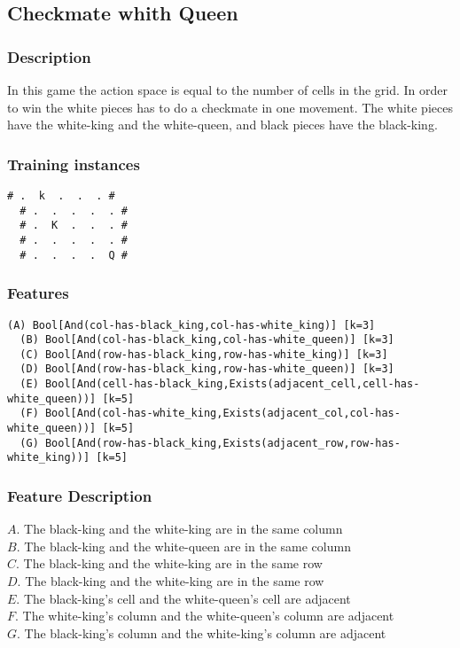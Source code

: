 \documentclass[a4paper]{article}
\begin{document}
\subsection{Checkmate whith Queen}
\subsubsection{Description}
In this game the action space is equal to the number of cells in the grid. In order to win the white pieces has to do a checkmate in one movement. The white pieces have the white-king and the white-queen, and black pieces have the black-king.

\subsubsection{Training instances}
\begin{Verbatim}[fontsize=\footnotesize]
  # .  k  .  .  . #
  # .  .  .  .  . #
  # .  K  .  .  . #
  # .  .  .  .  . #
  # .  .  .  .  Q #
\end{Verbatim}


\subsubsection{Features}
\begin{Verbatim}[fontsize=\footnotesize]
  (A) Bool[And(col-has-black_king,col-has-white_king)] [k=3]
  (B) Bool[And(col-has-black_king,col-has-white_queen)] [k=3]
  (C) Bool[And(row-has-black_king,row-has-white_king)] [k=3]
  (D) Bool[And(row-has-black_king,row-has-white_queen)] [k=3]
  (E) Bool[And(cell-has-black_king,Exists(adjacent_cell,cell-has-white_queen))] [k=5]
  (F) Bool[And(col-has-white_king,Exists(adjacent_col,col-has-white_queen))] [k=5]
  (G) Bool[And(row-has-black_king,Exists(adjacent_row,row-has-white_king))] [k=5]
\end{Verbatim}

\subsubsection{Feature Description}
$A$. The black-king and the white-king are in the same column\\
$B$. The black-king and the white-queen are in the same column\\
$C$. The black-king and the white-king are in the same row\\
$D$. The black-king and the white-king are in the same row\\
$E$. The black-king's cell and the white-queen's cell are adjacent\\
$F$. The white-king's column and the white-queen's column are adjacent\\
$G$. The black-king's column and the white-king's column are adjacent
\end{document}
